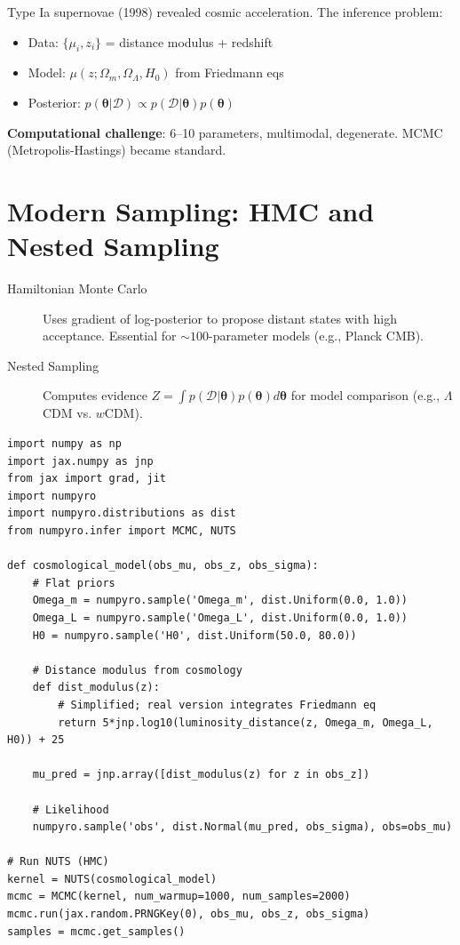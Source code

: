 Type Ia supernovae (1998) revealed cosmic acceleration. The inference problem: \cite{desouza2025astronomy}
\begin{itemize}
    \item Data: $\{\mu_i, z_i\}$ = distance modulus + redshift
    \item Model: $\mu(z; \Omega_m, \Omega_\Lambda, H_0)$ from Friedmann eqs
    \item Posterior: $p(\bm{\theta}|\mathcal{D}) \propto p(\mathcal{D}|\bm{\theta}) p(\bm{\theta})$
\end{itemize}

\textbf{Computational challenge}: 6--10 parameters, multimodal, degenerate. MCMC (Metropolis-Hastings) became standard.

\section{Modern Sampling: HMC and Nested Sampling}
\label{sec:astro:modern}

\begin{description}
    \item[Hamiltonian Monte Carlo] Uses gradient of log-posterior to propose distant states with high acceptance. Essential for $\sim 100$-parameter models (e.g., Planck CMB).
    \item[Nested Sampling] Computes evidence $Z = \int p(\mathcal{D}|\bm{\theta}) p(\bm{\theta}) d\bm{\theta}$ for model comparison (e.g., $\Lambda$CDM vs. $w$CDM).
\end{description}

\begin{lstlisting}[style=python,caption=HMC for cosmological parameters]
import numpy as np
import jax.numpy as jnp
from jax import grad, jit
import numpyro
import numpyro.distributions as dist
from numpyro.infer import MCMC, NUTS

def cosmological_model(obs_mu, obs_z, obs_sigma):
    # Flat priors
    Omega_m = numpyro.sample('Omega_m', dist.Uniform(0.0, 1.0))
    Omega_L = numpyro.sample('Omega_L', dist.Uniform(0.0, 1.0))
    H0 = numpyro.sample('H0', dist.Uniform(50.0, 80.0))
    
    # Distance modulus from cosmology
    def dist_modulus(z):
        # Simplified; real version integrates Friedmann eq
        return 5*jnp.log10(luminosity_distance(z, Omega_m, Omega_L, H0)) + 25
    
    mu_pred = jnp.array([dist_modulus(z) for z in obs_z])
    
    # Likelihood
    numpyro.sample('obs', dist.Normal(mu_pred, obs_sigma), obs=obs_mu)

# Run NUTS (HMC)
kernel = NUTS(cosmological_model)
mcmc = MCMC(kernel, num_warmup=1000, num_samples=2000)
mcmc.run(jax.random.PRNGKey(0), obs_mu, obs_z, obs_sigma)
samples = mcmc.get_samples()
\end{lstlisting}

